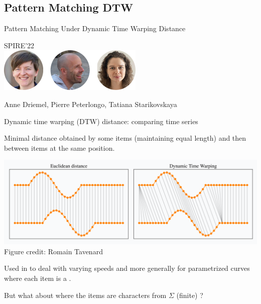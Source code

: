 \subsection{Pattern Matching DTW}

\newcommand{\dtw}{\mathrm{DTW}}
\newcommand{\ed}{\mathrm{ED}}
\newcommand{\RLE}{\mathrm{RLE}}


\begin{frame}
    \centering
    {\Large Pattern Matching Under Dynamic Time Warping Distance}
  
    \bigskip
    {\large SPIRE'22}\\
    \bigskip
    \includegraphics{pictures/mindmap/dtw.png}
  
    \bigskip
    Anne Driemel, Pierre Peterlongo, Tatiana Starikovskaya
\end{frame}


\begin{frame}{Dynamic time warping (DTW) distance: comparing time series}

 Minimal distance obtained by  some items (maintaining equal length) and then  between items at the same position.

\begin{center}
\includegraphics[scale=0.3]{figures/dtw_vs_euc.png}\\
\tiny{Figure credit: Romain Tavenard}
\end{center}
\pause
\small
Used in  to deal with varying speeds and more generally for parametrized curves where each item is a .\pause

\vfill
But what about  where the items are characters from $\Sigma$ (finite) ?
\end{frame}

